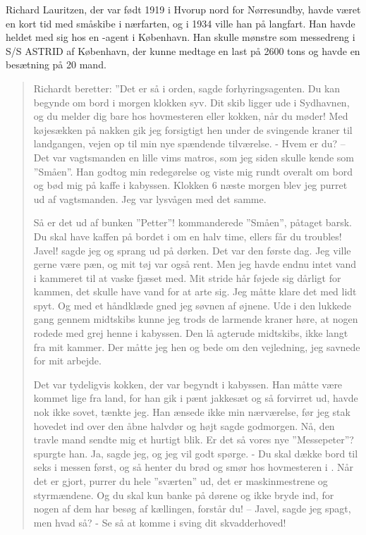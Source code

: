 Richard Lauritzen, der var født 1919 i
Hvorup nord for Nørresundby, havde været en kort tid med småskibe i
nærfarten, og i 1934 ville han på langfart. Han havde heldet med sig hos
en -agent i København. Han skulle mønstre som messedreng i
S/S ASTRID af København, der kunne medtage en last på 2600 tons og havde
en besætning på 20 mand. 

\begin{quote}

    Richardt beretter: ''Det er så i orden, sagde forhyringsagenten. Du
    kan begynde om bord i morgen klokken syv. Dit skib ligger ude i
    Sydhavnen, og du melder dig bare hos hovmesteren eller kokken, når du
    møder! Med køjesækken på nakken gik jeg forsigtigt hen under de
    svingende kraner til landgangen, vejen op til min nye spændende
    tilværelse. - Hvem er du? -- Det var vagtsmanden en lille vims
    matros, som jeg siden skulle kende som ''Småen''. Han godtog min
    redegørelse og viste mig rundt overalt om bord og bød mig på kaffe i
    kabyssen. Klokken 6 næste morgen blev jeg purret ud af vagtsmanden.
    Jeg var lysvågen med det samme.
    
    Så er det ud af bunken ''Petter''! kommanderede ''Småen'', påtaget
    barsk.  Du skal have kaffen på bordet i  om en halv time, ellers får du troubles!
    Javel! sagde jeg og sprang ud på dørken. Det var den første dag. Jeg
    ville gerne være pæn, og mit tøj var også rent. Men jeg havde endnu
    intet vand i kammeret til at vaske fjæset med. Mit stride hår føjede
    sig dårligt for kammen, det skulle have vand for at arte sig. Jeg
    måtte klare det med lidt spyt. Og med et håndklæde gned jeg søvnen af
    øjnene. Ude i den lukkede gang gennem midtskibs kunne jeg trods de
    larmende kraner høre, at nogen rodede med grej henne i kabyssen. Den
    lå agterude midtskibs, ikke langt fra mit kammer. Der måtte jeg hen
    og bede om den vejledning, jeg savnede for mit arbejde.
    
    Det var tydeligvis kokken, der var begyndt i kabyssen. Han måtte være
    kommet lige fra land, for han gik i pænt jakkesæt og så forvirret ud,
    havde nok ikke sovet, tænkte jeg. Han ænsede ikke min nærværelse, før
    jeg stak hovedet ind over den åbne halvdør og højt sagde godmorgen.
    Nå, den travle mand sendte mig et hurtigt blik. Er det så vores nye
    ''Messepeter''? spurgte han. Ja, sagde jeg, og jeg vil godt spørge. -
    Du skal dække bord til seks i messen først, og så henter du brød og
    smør hos hovmesteren i . Når det er gjort, purrer du hele ''sværten'' ud, det
    er maskinmestrene og styrmændene. Og du skal kun banke på dørene og
    ikke bryde ind, for nogen af dem har besøg af kællingen, forstår du!
    -- Javel, sagde jeg spagt, men hvad så? - Se så at komme i sving dit
    skvadderhoved! 
    

\end{quote}
